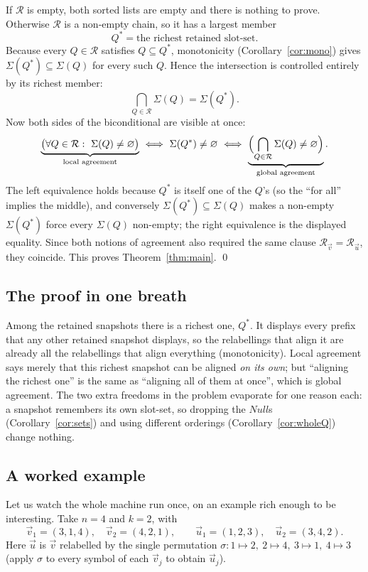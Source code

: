 \documentclass{article}
\begin{document}
If $\mathcal R$ is empty, both sorted lists are empty and there is nothing to prove.
Otherwise $\mathcal R$ is a non-empty chain, so it has a largest member
\[
Q^{\ast}=\text{the richest retained slot-set.}
\]
Because every $Q\in\mathcal R$ satisfies $Q\subseteq Q^\ast$, monotonicity
(Corollary~\ref{cor:mono}) gives $\Sigma(Q^\ast)\subseteq\Sigma(Q)$ for every such
$Q$.  Hence the intersection is controlled entirely by its richest member:
\[
\bigcap_{Q\in\mathcal R}\Sigma(Q)=\Sigma(Q^{\ast}).
\]
Now both sides of the biconditional are visible at once:
\[
\underbrace{\bigl(\forall Q\in\mathcal R:\ \Sigma(Q)\neq\varnothing\bigr)}
_{\text{local agreement}}
\ \Longleftrightarrow\
\Sigma(Q^{\ast})\neq\varnothing
\ \Longleftrightarrow\
\underbrace{\Bigl(\bigcap_{Q\in\mathcal R}\Sigma(Q)\neq\varnothing\Bigr)}
_{\text{global agreement}} .
\]
The left equivalence holds because $Q^\ast$ is itself one of the $Q$'s (so the
``for all'' implies the middle), and conversely $\Sigma(Q^\ast)\subseteq\Sigma(Q)$
makes a non-empty $\Sigma(Q^\ast)$ force every $\Sigma(Q)$ non-empty; the right
equivalence is the displayed equality.  Since both notions of agreement also
required the same clause $\mathcal R_{\vec v}=\mathcal R_{\vec u}$, they coincide.
This proves Theorem~\ref{thm:main}. \qed

\subsection*{The proof in one breath}

Among the retained snapshots there is a richest one, $Q^\ast$.  It displays every
prefix that any other retained snapshot displays, so the relabellings that align it
are already all the relabellings that align everything (monotonicity).  Local
agreement says merely that this richest snapshot can be aligned \emph{on its own};
but ``aligning the richest one'' is the same as ``aligning all of them at once'',
which is global agreement.  The two extra freedoms in the problem evaporate for one
reason each: a snapshot remembers its own slot-set, so dropping the $Null$s
(Corollary~\ref{cor:sets}) and using different orderings
(Corollary~\ref{cor:wholeQ}) change nothing.

\subsection*{A worked example}

Let us watch the whole machine run once, on an example rich enough to be
interesting.  Take $n=4$ and $k=2$, with
\[
\vec v_1=(3,1,4),\quad \vec v_2=(4,2,1),
\qquad
\vec u_1=(1,2,3),\quad \vec u_2=(3,4,2).
\]
Here $\vec u$ is $\vec v$ relabelled by the single permutation
$\sigma:1\mapsto2,\ 2\mapsto4,\ 3\mapsto1,\ 4\mapsto3$ (apply $\sigma$ to every
symbol of each $\vec v_j$ to obtain $\vec u_j$).
\end{document}
